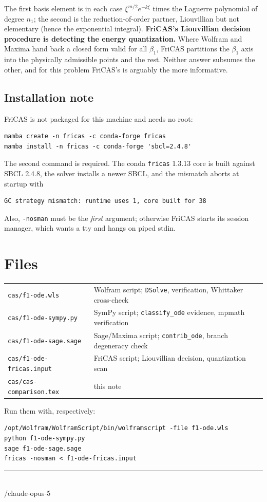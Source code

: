 \documentclass[11pt]{article}
\begin{document}
\noindent The first basis element is in each case $\xi^{m/2}e^{-k\xi}$
times the Laguerre polynomial of degree $n_1$; the second is the
reduction-of-order partner, Liouvillian but not elementary (hence the
exponential integral).  \textbf{FriCAS's Liouvillian decision procedure is
detecting the energy quantization.}  Where Wolfram and Maxima hand back a
closed form valid for all $\beta_1$, FriCAS partitions the $\beta_1$ axis
into the physically admissible points and the rest.  Neither answer
subsumes the other, and for this problem FriCAS's is arguably the more
informative.

\subsection*{Installation note}

FriCAS is not packaged for this machine and needs no root:
\begin{lstlisting}
mamba create -n fricas -c conda-forge fricas
mamba install -n fricas -c conda-forge 'sbcl=2.4.8'
\end{lstlisting}
\noindent The second command is required.  The conda \verb|fricas| 1.3.13
core is built against SBCL 2.4.8, the solver installs a newer SBCL, and the
mismatch aborts at startup with
\begin{lstlisting}
GC strategy mismatch: runtime uses 1, core built for 38
\end{lstlisting}
\noindent Also, \verb|-nosman| must be the \emph{first}
argument; otherwise FriCAS starts its session manager, which wants a tty
and hangs on piped stdin.

\section{Files}

\begin{tabular}{@{}ll@{}}
\toprule
\verb|cas/f1-ode.wls|       & Wolfram script; \verb|DSolve|, verification, Whittaker cross-check \\
\verb|cas/f1-ode-sympy.py|  & SymPy script; \verb|classify_ode| evidence, mpmath verification \\
\verb|cas/f1-ode-sage.sage| & Sage/Maxima script; \verb|contrib_ode|, branch degeneracy check \\
\verb|cas/f1-ode-fricas.input| & FriCAS script; Liouvillian decision, quantization scan \\
\verb|cas/cas-comparison.tex| & this note \\
\bottomrule
\end{tabular}

\bigskip
\noindent Run them with, respectively:
\begin{lstlisting}
/opt/Wolfram/WolframScript/bin/wolframscript -file f1-ode.wls
python f1-ode-sympy.py
sage f1-ode-sage.sage
fricas -nosman < f1-ode-fricas.input
\end{lstlisting}

\vspace{2em}
\noindent\rule{0.3\textwidth}{0.4pt}\\
{\footnotesize /claude-opus-5}
\end{document}
